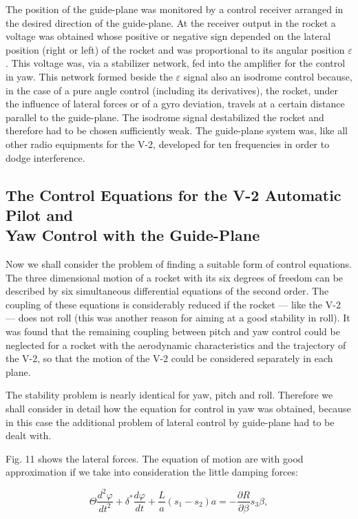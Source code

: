 \documentclass[12pt, a4paper]{article}
\begin{document}
The position of the guide-plane was monitored by a control receiver arranged in the desired direction of the guide-plane. At the receiver output in the rocket a voltage was obtained whose positive or negative sign depended on the lateral position (right or left) of the rocket and was proportional to its angular position $\varepsilon$. This voltage was, via a stabilizer network, fed into the amplifier for the control in yaw. This network formed beside the $\varepsilon$ signal also an isodrome control because, in the case of a pure angle control (including its derivatives), the rocket, under the influence of lateral forces or of a gyro deviation, travels at a certain distance parallel to the guide-plane. The isodrome signal destabilized the rocket and therefore had to be chosen sufficiently weak. The guide-plane system was, like all other radio equipments for the V-2, developed for ten frequencies in order to dodge interference.

\subsection[The Control Equations for the V-2 Automatic Pilot and Yaw Control with the Guide-Plane]{The Control Equations for the V-2 Automatic Pilot and\\Yaw Control with the Guide-Plane}

Now we shall consider the problem of finding a suitable form of control equations. The three dimensional motion of a rocket with its six degrees of freedom can be described by six simultaneous differential equations of the second order. The coupling of these equations is considerably reduced if the rocket — like the V-2 — does not roll (this was another reason for aiming at a good stability in roll). It was found that the remaining coupling between pitch and yaw control could be neglected for a rocket with the aerodynamic characteristics and the trajectory of the V-2, so that the motion of the V-2 could be considered separately in each plane.

The stability problem is nearly identical for yaw, pitch and roll. Therefore we shall consider in detail how the equation for control in yaw was obtained, because in this case the additional problem of lateral control by guide-plane had to be dealt with.

Fig. 11 shows the lateral forces. The equation of motion are with good approximation if we take into consideration the little damping forces:

\begin{equation}
  \Theta\frac{d^{2}\varphi}{dt^{2}}+\delta^{*}\frac{d\varphi}{dt}+\frac{L}{a}(s_{1}-s_{2})a=-\frac{\partial R}{\partial\beta}s_{3}\beta,
\end{equation}
\end{document}
